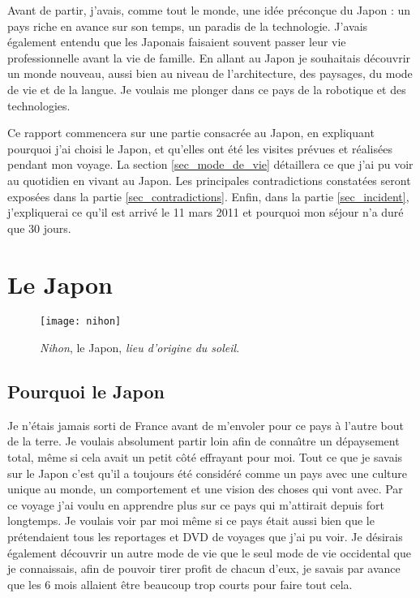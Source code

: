\documentclass[11pt,journal]{RapportFR}
\begin{document}
\begin{CJK*}{UTF8}{min}
Avant de partir, j'avais, comme tout le monde, une id\'ee pr\'econ\c cue du Japon : un pays riche en avance sur son temps, un paradis de la technologie. J'avais \'egalement entendu que les Japonais faisaient souvent passer leur vie professionnelle avant la vie de famille. 
En allant au Japon je souhaitais d\'ecouvrir un monde nouveau, aussi bien au niveau de l'architecture, des paysages, du mode de vie et de la langue. Je voulais me plonger dans ce pays de la robotique et des technologies. 

Ce rapport commencera sur une partie consacr\'ee au Japon, en expliquant pourquoi j'ai choisi le Japon, et qu'elles ont \'et\'e les visites pr\'evues et r\'ealis\'ees pendant mon voyage. La section \ref{sec_mode_de_vie} d\'etaillera ce que j'ai pu voir au quotidien en vivant au Japon. Les principales contradictions constat\'ees seront expos\'ees dans la partie \ref{sec_contradictions}. Enfin, dans la partie \ref{sec_incident}, j'expliquerai ce qu'il est arriv\'e le 11 mars 2011 et pourquoi mon s\'ejour n'a dur\'e que 30 jours.



\section{Le Japon}

\begin{figure}[!t]
\centering
\texttt{[image: nihon]}
\caption{\textit{Nihon}, le Japon, \textit{lieu d'origine du soleil}.}
\label{fig_nihon}
\end{figure}

\subsection{Pourquoi le Japon}

Je n'\'etais jamais sorti de France avant de m'envoler pour ce pays \`a l'autre bout de la terre. Je voulais absolument partir loin afin de conna\^\i tre un d\'epaysement total, m\^eme si cela avait un petit c\^ot\'e effrayant pour moi.
Tout ce que je savais sur le Japon c'est qu'il a toujours \'et\'e consid\'er\'e comme un pays avec une culture unique au monde, un comportement et une vision des choses qui vont avec. Par ce voyage j'ai voulu en apprendre plus sur ce pays qui m'attirait depuis fort longtemps. Je voulais voir par moi m\^eme si ce pays \'etait aussi bien que le pr\'etendaient tous les reportages et DVD de voyages que j'ai pu voir. Je d\'esirais \'egalement d\'ecouvrir un autre mode de vie que le seul mode de vie occidental que je connaissais, afin de pouvoir tirer profit de chacun d'eux, je savais par avance que les 6 mois allaient \^etre beaucoup trop courts pour faire tout cela. 


\end{CJK*}
\end{document}
